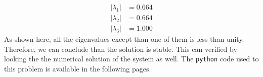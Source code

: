 %
\begin{align*}
	|\lambda_1| &= 0.664 \\
	|\lambda_2| &= 0.664 \\
	|\lambda_3| &= 1.000
\end{align*}
%
As shown here, all the eigenvalues except than one of them is less than unity. Therefore, we can conclude than the solution is stable. This can verified by looking the the numerical solution of the system as well. The \texttt{python} code used to this problem is available in the following pages.